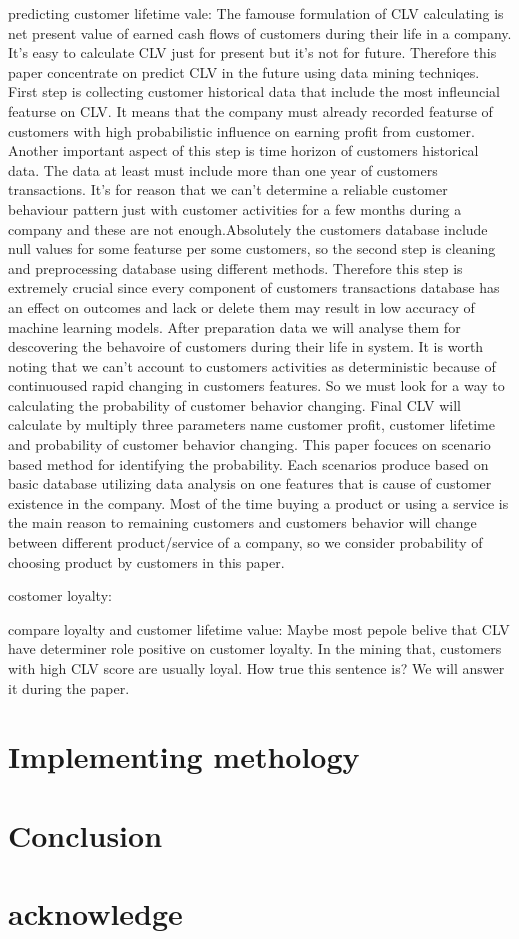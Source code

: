 \documentclass{article}
\begin{document}
\par predicting customer lifetime vale:
The famouse formulation of CLV calculating is net present value of earned cash flows of customers during their life in a company. It's easy to calculate CLV just for present but it's not for future. Therefore this paper concentrate on predict CLV in the future using  data mining techniqes. First step is collecting customer historical data that include the most infleuncial featurse on CLV. It means that the company must already recorded featurse of customers with high probabilistic influence on earning profit from customer. Another important aspect of this step is time horizon of customers historical data. The data at least must include more than one year of customers transactions. It's for reason that we can't determine a reliable customer behaviour pattern just with customer activities for a few months during a company and these are not enough.Absolutely the customers database include null values for some featurse per some customers, so the second step is cleaning and preprocessing database using different methods. Therefore this step is extremely crucial since every component of customers transactions database has an effect on outcomes and lack or delete them may result in low accuracy of machine learning models. After preparation data we will analyse them for descovering the behavoire of customers during their life in system. It is worth noting that we can't account to customers activities as deterministic because of continuoused rapid changing in customers features. So we must look for a way to calculating the probability of customer behavior changing. Final CLV will calculate by multiply three parameters name customer profit, customer lifetime and probability of customer behavior changing. This paper focuces on scenario based method for identifying the probability. Each scenarios produce based on basic database utilizing data analysis on one features that is cause of customer existence in the company. Most of the time buying a product or using a service is the main reason to remaining customers and customers behavior will change between different product/service of a company, so we consider probability of choosing product by customers in this paper.

\par costomer loyalty:
\par
\par compare loyalty and customer lifetime value:
Maybe most pepole belive  that CLV have determiner role positive on customer loyalty. In the mining that, customers with high CLV score are usually loyal. How true this sentence is? We will answer it during the paper. 
\section{Implementing methology}\label{sec.Example}

\section{Conclusion}\label{sec.Conclusion}

\section*{acknowledge}
\end{document}
